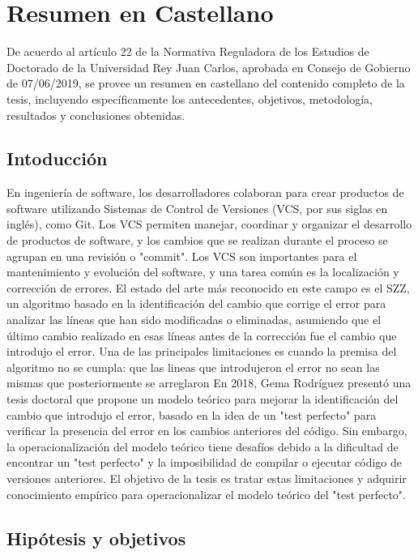 \chapter{Resumen en Castellano}

De acuerdo al artículo 22 de la Normativa Reguladora de los Estudios de Doctorado de la Universidad Rey Juan Carlos, aprobada en Consejo de Gobierno de 07/06/2019, se provee un resumen en castellano del contenido completo de la tesis, incluyendo específicamente los antecedentes, objetivos, metodología, resultados y conclusiones obtenidas.

\section{Intoducción}

En ingeniería de software, los desarrolladores colaboran para crear productos de software utilizando Sistemas de Control de Versiones (VCS, por sus siglas en inglés), como Git. 
Los VCS permiten manejar, coordinar y organizar el desarrollo de productos de software, y los cambios que se realizan durante el proceso se agrupan en una revisión o "commit". 
Los VCS son importantes para el mantenimiento y evolución del software, y una tarea común es la localización y corrección de errores. 
El estado del arte más reconocido en este campo es el SZZ, un algoritmo basado en la identificación del cambio que corrige el error para analizar las líneas que han sido modificadas o eliminadas, asumiendo que el último cambio realizado en esas líneas antes de la corrección fue el cambio que introdujo el error. 
Una de las principales limitaciones es cuando la premisa del algoritmo no se cumpla: que las lineas que introdujeron el error no sean
las mismas que posteriormente se arreglaron
En 2018, Gema Rodríguez presentó una tesis doctoral que propone un modelo teórico para mejorar la identificación del cambio que introdujo el error, basado en la idea de un "test perfecto" para verificar la presencia del error en los cambios anteriores del código. 
Sin embargo, la operacionalización del modelo teórico tiene desafíos debido a la dificultad de encontrar un "test perfecto" y la imposibilidad de compilar o ejecutar código de versiones anteriores. 
El objetivo de la tesis es tratar estas limitaciones y adquirir conocimiento empírico para operacionalizar el modelo teórico del "test perfecto".

\section{Hipótesis y objetivos}

